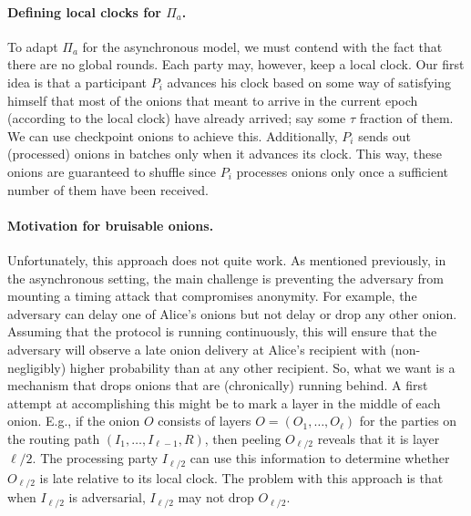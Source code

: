 \documentclass[runningheads,a4paper]{llncs}
\begin{document}
\paragraph{Defining local clocks for $\Pi_a$.}
To adapt $\Pi_a$ for the asynchronous model, we must contend with the fact that there are no global rounds. Each party may, however, keep a local clock.  Our first idea is that a participant $P_i$ advances his clock based on some way of satisfying himself that most of the onions that meant to arrive in the current epoch (according to the local clock) have already arrived; say some $\tau$ fraction of them.  We can use checkpoint onions to achieve this.
Additionally, $P_i$ sends out (processed) onions in batches only when it advances its clock. This way, these onions are guaranteed to shuffle since $P_i$ processes onions only once a sufficient number of them have been received.


\paragraph{Motivation for bruisable onions.} 
Unfortunately, this approach does not quite work. 
As mentioned previously, in the asynchronous setting, the main challenge is preventing the adversary from mounting a timing attack that compromises anonymity. For example, the adversary can delay one of Alice's onions but not delay or drop any other onion. Assuming that the protocol is running continuously, this will ensure that the adversary will observe a late onion delivery at Alice's recipient with (non-negligibly) higher probability than at any other recipient. So, what we want is a mechanism that drops onions that are (chronically) running behind. A first attempt at accomplishing this might be to mark a layer in the middle of each onion. E.g., if the onion $O$ consists of layers $O = (O_1, \dots, O_{\ell})$ for the parties on the routing path $(I_1, \dots, I_{\ell-1}, R)$, then peeling $O_{\ell/2}$ reveals that it is layer $\ell/2$. The processing party $I_{\ell/2}$ can use this information to determine whether $O_{\ell/2}$ is late relative to its local clock. The problem with this approach is that %
when $I_{\ell/2}$ is adversarial, $I_{\ell/2}$ may not drop $O_{\ell/2}$. 
\end{document}
